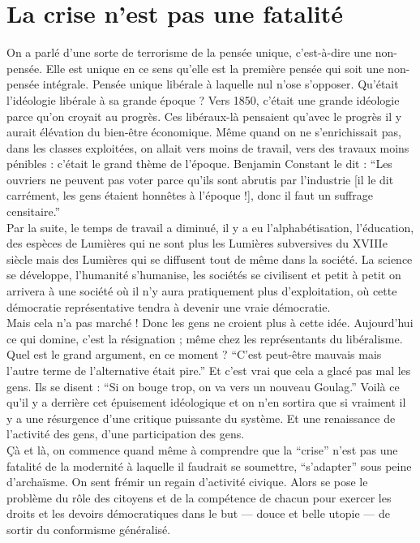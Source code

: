 \section*{La crise n'est pas une fatalité}

On a parlé d’une sorte de terrorisme de la pensée unique, c’est-à-dire une non-pensée. Elle est unique en ce sens qu’elle est la première pensée qui soit une non-pensée intégrale. Pensée unique libérale à laquelle nul n’ose s’opposer. Qu’était l’idéologie libérale à sa grande époque ? Vers 1850, c’était une grande idéologie parce qu’on croyait au progrès. Ces libéraux-là pensaient qu’avec le progrès il y aurait élévation du bien-être économique. Même quand on ne s’enrichissait pas, dans les classes exploitées, on allait vers moins de travail, vers des travaux moins pénibles : c’était le grand thème de l’époque. Benjamin Constant le dit : ``Les ouvriers ne peuvent pas voter parce qu’ils sont abrutis par l’industrie [il le dit carrément, les gens étaient honnêtes à l’époque !], donc il faut un suffrage censitaire.''\\
Par la suite, le temps de travail a diminué, il y a eu l’alphabétisation, l’éducation, des espèces de Lumières qui ne sont plus les Lumières subversives du XVIIIe siècle mais des Lumières qui se diffusent tout de même dans la société. La science se développe, l’humanité s’humanise, les sociétés se civilisent et petit à petit on arrivera à une société où il n’y aura pratiquement plus d’exploitation, où cette démocratie représentative tendra à devenir une vraie démocratie.\\
Mais cela n’a pas marché ! Donc les gens ne croient plus à cette idée. Aujourd’hui ce qui domine, c’est la résignation ; même chez les représentants du libéralisme. Quel est le grand argument, en ce moment ? ``C’est peut-être mauvais mais l’autre terme de l’alternative était pire.'' Et c’est vrai que cela a glacé pas mal les gens. Ils se disent : ``Si on bouge trop, on va vers un nouveau Goulag.'' Voilà ce qu’il y a derrière cet épuisement idéologique et on n’en sortira que si vraiment il y a une résurgence d’une critique puissante du système. Et une renaissance de l’activité des gens, d’une participation des gens.\\
Çà et là, on commence quand même à comprendre que la ``crise'' n’est pas une fatalité de la modernité à laquelle il faudrait se soumettre, ``s’adapter'' sous peine d’archaïsme. On sent frémir un regain d’activité civique. Alors se pose le problème du rôle des citoyens et de la compétence de chacun pour exercer les droits et les devoirs démocratiques dans le but --- douce et belle utopie --- de sortir du conformisme généralisé.\\
